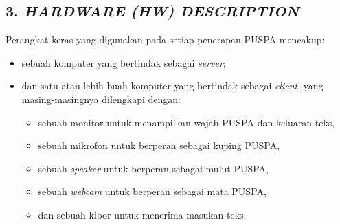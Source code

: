 \subsection*{\textcolor{subsectioncolor}{\textsf{3. \textit{HARDWARE (HW) DESCRIPTION}}}}

Perangkat keras yang digunakan pada setiap penerapan PUSPA mencakup:
\begin{itemize}
\item sebuah komputer yang bertindak sebagai \textit{server};
\item dan satu atau lebih buah komputer yang bertindak sebagai \textit{client}, yang masing-masingnya dilengkapi dengan:
	\begin{itemize}
	\item sebuah monitor untuk menampilkan wajah PUSPA dan keluaran teks,
	\item sebuah mikrofon untuk berperan sebagai kuping PUSPA,
	\item sebuah \textit{speaker} untuk berperan sebagai mulut PUSPA,
	\item sebuah \textit{webcam} untuk berperan sebagai mata PUSPA,
	\item dan sebuah kibor untuk menerima masukan teks.
	\end{itemize}
\end{itemize}
